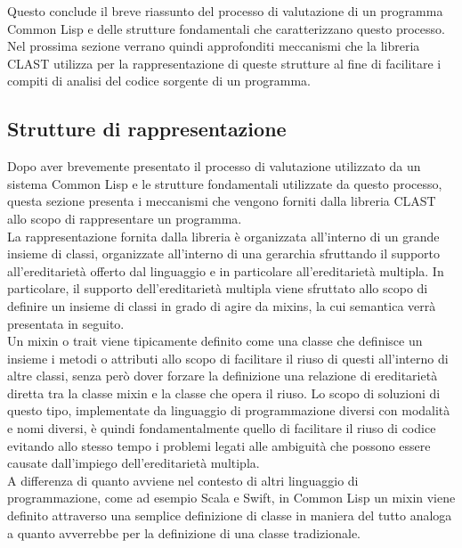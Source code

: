 Questo conclude il breve riassunto del processo di valutazione di un programma
Common Lisp e delle strutture fondamentali che caratterizzano questo processo.
Nel prossima sezione verrano quindi approfonditi meccanismi che la libreria
CLAST utilizza per la rappresentazione di queste strutture al fine di
facilitare i compiti di analisi del codice sorgente di un programma.

\subsection{Strutture di rappresentazione}

Dopo aver brevemente presentato il processo di valutazione utilizzato da un
sistema Common Lisp e le strutture fondamentali utilizzate da questo processo,
questa sezione presenta i meccanismi che vengono forniti dalla libreria CLAST
allo scopo di rappresentare un programma.\\

La rappresentazione fornita dalla libreria è organizzata all’interno di un
grande insieme di classi, organizzate all’interno di una gerarchia sfruttando
il supporto all’ereditarietà offerto dal linguaggio e in particolare
all’ereditarietà multipla. In particolare, il supporto dell’ereditarietà
multipla viene sfruttato allo scopo di definire un insieme di classi in grado
di agire da mixins, la cui semantica verrà presentata in seguito.\\

Un mixin o trait viene tipicamente definito come una classe che definisce un
insieme i metodi o attributi allo scopo di facilitare il riuso di questi
all’interno di altre classi, senza però dover forzare la definizione una
relazione di ereditarietà diretta tra la classe mixin e la classe che opera il
riuso. Lo scopo di soluzioni di questo tipo, implementate da linguaggio di
programmazione diversi con modalità e nomi diversi, è quindi fondamentalmente
quello di facilitare il riuso di codice evitando allo stesso tempo i problemi
legati alle ambiguità che possono essere causate dall’impiego
dell’ereditarietà multipla.\\

A differenza di quanto avviene nel contesto di altri linguaggio di
programmazione, come ad esempio Scala e Swift, in Common Lisp un mixin viene
definito attraverso una semplice definizione di classe in maniera del tutto
analoga a quanto avverrebbe per la definizione di una classe tradizionale.\\

